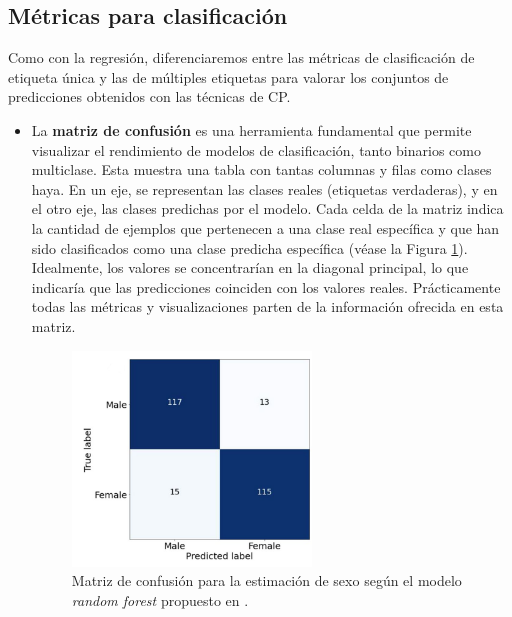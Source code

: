 
\subsection{Métricas para clasificación}

Como con la regresión, diferenciaremos entre las métricas de clasificación de etiqueta única y las de múltiples etiquetas para valorar los conjuntos de predicciones obtenidos con las técnicas de CP.

\begin{itemize}

    \item La \textbf{matriz de confusión} es una herramienta fundamental que permite visualizar el rendimiento de modelos de clasificación, tanto binarios como multiclase. Esta muestra una tabla con tantas columnas y filas como clases haya. En un eje, se representan las clases reales (etiquetas verdaderas), y en el otro eje, las clases predichas por el modelo. Cada celda de la matriz indica la cantidad de ejemplos que pertenecen a una clase real específica y que han sido clasificados como una clase predicha específica (véase la Figura \ref{fig:conf_matrix_binary}). Idealmente, los valores se concentrarían en la diagonal principal, lo que indicaría que las predicciones coinciden con los valores reales. Prácticamente todas las métricas y visualizaciones parten de la información ofrecida en esta matriz. 

    \begin{figure}[h]
        \centering
        \includegraphics[width=0.6\textwidth]{capitulos/cap_02/imagenes/confusion_matrix_binary.png}
        \caption{
            Matriz de confusión para la estimación de sexo según el modelo \textit{random forest} propuesto en \cite{bidmos2023}.
        } 
        \label{fig:conf_matrix_binary}
    \end{figure}
    

\end{itemize}
